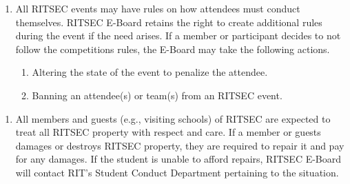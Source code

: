 
\begin{enumerate}
      \item All RITSEC events may have rules on how attendees must conduct themselves.
            RITSEC E-Board retains the right to create additional rules during the event if
            the need arises. If a member or participant decides to not follow the
            competitions rules, the E-Board may take the following actions.
            \begin{enumerate}
                  \item Altering the state of the event to penalize the attendee.
                  \item Banning an attendee(s) or team(s) from an RITSEC event. %
            \end{enumerate}
\end{enumerate}


\begin{enumerate}
      \item All members and guests (e.g., visiting schools) of RITSEC are expected to treat
            all RITSEC property with respect and care. If a member or guests damages or
            destroys RITSEC property, they are required to repair it and pay for any
            damages. If the student is unable to afford repairs, RITSEC E-Board will
            contact RIT's Student Conduct Department pertaining to the situation.
\end{enumerate}
